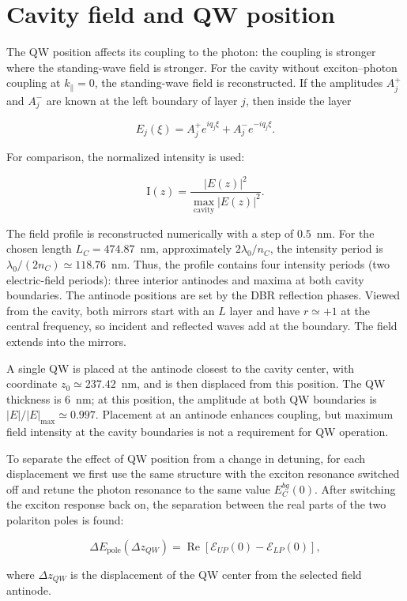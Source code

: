 \documentclass[12pt,a4paper]{article}
\begin{document}
\clearpage
\section{Cavity field and QW position}

The QW position affects its coupling to the photon: the coupling is stronger where the standing-wave field is stronger. For the cavity without exciton--photon coupling at $k_\parallel=0$, the standing-wave field is reconstructed. If the amplitudes $A_j^+$ and $A_j^-$ are known at the left boundary of layer $j$, then inside the layer

\[
E_j(\xi)
=
A_j^+e^{iq_j\xi}
+
A_j^-e^{-iq_j\xi}.
\]

For comparison, the normalized intensity is used:

\[
\mathrm{I}(z)=
\frac{|E(z)|^2}
{\max_{\mathrm{cavity}}|E(z)|^2}.
\]

The field profile is reconstructed numerically with a step of $0.5$~nm. For the chosen length $L_C=474.87$~nm, approximately $2\lambda_0/n_C$, the intensity period is $\lambda_0/(2n_C)\simeq118.76$~nm. Thus, the profile contains four intensity periods (two electric-field periods): three interior antinodes and maxima at both cavity boundaries. The antinode positions are set by the DBR reflection phases. Viewed from the cavity, both mirrors start with an $L$ layer and have $r\simeq+1$ at the central frequency, so incident and reflected waves add at the boundary. The field extends into the mirrors.

A single QW is placed at the antinode closest to the cavity center, with coordinate $z_0\simeq237.42$~nm, and is then displaced from this position. The QW thickness is $6$~nm; at this position, the amplitude at both QW boundaries is $|E|/|E|_{\max}\simeq0.997$. Placement at an antinode enhances coupling, but maximum field intensity at the cavity boundaries is not a requirement for QW operation.

To separate the effect of QW position from a change in detuning, for each displacement we first use the same structure with the exciton resonance switched off and retune the photon resonance to the same value $E_C^{bg}(0)$. After switching the exciton response back on, the separation between the real parts of the two polariton poles is found:

\[
\Delta E_{\mathrm{pole}}(\Delta z_{QW})
=
\operatorname{Re}
\left[
\mathcal E_{UP}(0)-\mathcal E_{LP}(0)
\right],
\]

where $\Delta z_{QW}$ is the displacement of the QW center from the selected field antinode.
\end{document}
